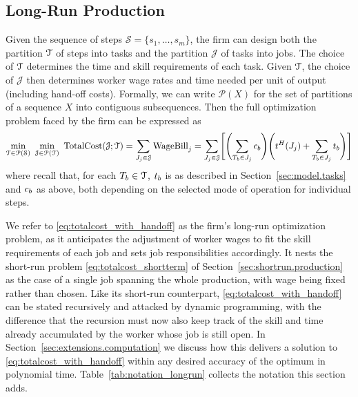 \subsection{Long-Run Production}
\label{sec:longrun.production}

Given the sequence of steps $\mathcal{S} = \{s_1, \dotsc, s_m\}$, the firm can design both the partition $\mathcal{T}$ of steps into tasks and the partition $\mathcal{J}$ of tasks into jobs.
The choice of $\mathcal{T}$ determines the time and skill requirements of each task.
Given $\mathcal{T}$, the choice of $\mathcal{J}$ then determines worker wage rates and time needed per unit of output (including hand-off costs).
Formally, we can write $\mathcal{P}(X)$ for the set of partitions of a sequence $X$ into contiguous subsequences.
Then the full optimization problem faced by the firm can be expressed as
\begin{align}
\label{eq:totalcost_with_handoff}
\min_{\mathcal{T} \in \mathcal{P}(\mathcal{S})} \
\min_{\mathcal{J} \in \mathcal{P}(\mathcal{T})} \
\text{TotalCost}(\mathcal{J}; \mathcal{T})
= \sum_{J_j \in \mathcal{J}} \text{WageBill}_j =
\sum_{J_j \in \mathcal{J}} \Biggl[\Biggl(\sum_{T_b \in J_j} c_{b} \Biggr) \Biggl(t^{H}_{}(J_j) + \sum_{T_b \in J_j} t_{b} \Biggr)\Biggr]
\end{align}
where recall that, for each $T_b \in \mathcal{T}$, $t_{b}$ is as described in Section~\ref{sec:model.tasks} and $c_{b}$ as above, both depending on the selected mode of operation for individual steps.

We refer to \eqref{eq:totalcost_with_handoff} as the firm's long-run optimization problem, as it anticipates the adjustment of worker wages to fit the skill requirements of each job and sets job responsibilities accordingly.
It nests the short-run problem \eqref{eq:totalcost_shortterm} of Section~\ref{sec:shortrun.production} as the case of a single job spanning the whole production, with wage being fixed rather than chosen.
Like its short-run counterpart, \eqref{eq:totalcost_with_handoff} can be stated recursively and attacked by dynamic programming, with the difference that the recursion must now also keep track of the skill and time already accumulated by the worker whose job is still open. In Section~\ref{sec:extensions.computation} we discuss how this delivers a solution to \eqref{eq:totalcost_with_handoff} within any desired accuracy of the optimum in polynomial time.
Table~\ref{tab:notation_longrun} collects the notation this section adds.


